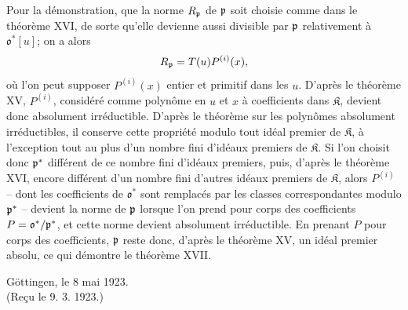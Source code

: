 Pour la démonstration, que la norme $R_\mathfrak p$ de $\mathfrak p$ soit choisie comme dans le théorème XVI, de sorte qu'elle devienne aussi divisible par $\mathfrak p$ relativement à $\mathfrak o^*[u]$; on a alors
\[
 R_\mathfrak p=T(u)P^{(i)}(x),
\]
où l'on peut supposer $P^{(i)}(x)$ entier et primitif dans les $u$. D'après le théorème XV, $P^{(i)}$, considéré comme polynôme en $u$ et $x$ à coefficients dans $\mathfrak K$, devient donc absolument irréductible. D'après le théorème sur les polynômes absolument irréductibles, il conserve cette propriété modulo tout idéal premier de $\mathfrak K$, à l'exception tout au plus d'un nombre fini d'idéaux premiers de $\mathfrak K$. Si l'on choisit donc $\mathfrak p^*$ différent de ce nombre fini d'idéaux premiers, puis, d'après le théorème XVI, encore différent d'un nombre fini d'autres idéaux premiers de $\mathfrak K$, alors $P^{(i)}$ -- dont les coefficients de $\mathfrak o^*$ sont remplacés par les classes correspondantes modulo $\mathfrak p^*$ -- devient la norme de $\mathfrak p$ lorsque l'on prend pour corps des coefficients $P=\mathfrak o^*/\mathfrak p^*$, et cette norme devient absolument irréductible. En prenant $P$ pour corps des coefficients, $\mathfrak p$ reste donc, d'après le théorème XV, un idéal premier absolu, ce qui démontre le théorème XVII.

\begin{center}
Göttingen, le 8 mai 1923.\\[1em]
(Reçu le 9. 3. 1923.)
\end{center}
